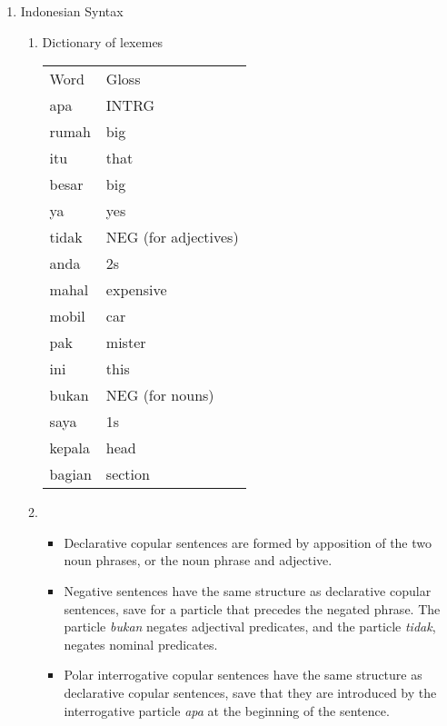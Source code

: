 \documentclass[12pt]{article}
\begin{document}
\begin{enumerate}
\begin{enumerate}
\end{enumerate}

\item Indonesian Syntax
\begin{enumerate}

\item Dictionary of lexemes\\
\begin{tabular}{ll}
Word   & Gloss                \\
apa    & INTRG                \\
rumah  & big                  \\
itu    & that                 \\
besar  & big                  \\
ya     & yes                  \\
tidak  & NEG (for adjectives) \\
anda   & 2s                   \\
mahal  & expensive            \\
mobil  & car                  \\
pak    & mister               \\
ini    & this                 \\
bukan  & NEG (for nouns)      \\
saya   & 1s                   \\
kepala & head                 \\
bagian & section             
\end{tabular}

\item 
\begin{itemize}
\item Declarative copular sentences are formed by apposition of the two noun phrases, or the noun phrase and adjective.

\item  Negative sentences have the same structure as declarative copular sentences, save for a particle that precedes the negated phrase. The particle \emph{bukan} negates adjectival predicates, and the particle \emph{tidak}, negates nominal predicates.

\item Polar interrogative copular sentences have the same structure as declarative copular sentences, save that they are introduced by the interrogative particle \emph{apa} at the beginning of the sentence.
\end{itemize}


\end{enumerate}
\end{enumerate}
\end{document}
